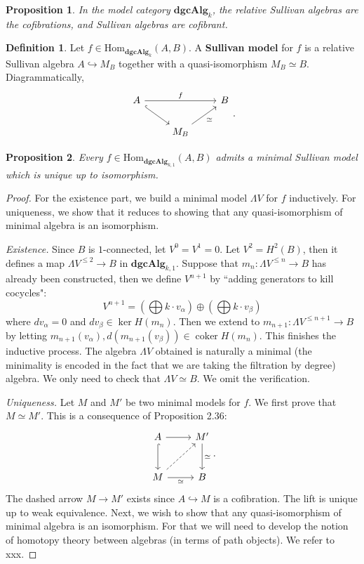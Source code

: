\documentclass[psamsfonts]{amsart}
\newtheorem{prop}{Proposition}[section]
\theoremstyle{definition}
\newtheorem{defn}{Definition}[section]
\newcommand{\dgcAlg}{\mathbf{dgcAlg}}
\newcommand{\Hom}{\mathrm{Hom}}
\DeclareMathOperator{\coker}{coker}
\numberwithin{equation}{section}
\begin{document}
\begin{prop}
In the model category $\dgcAlg_k$, the relative Sullivan algebras are the cofibrations, and Sullivan algebras are cofibrant.
\end{prop}

\begin{defn}
Let $f\in\Hom_{\dgcAlg_k}(A,B)$. A \textbf{Sullivan model} for $f$ is a relative Sullivan algebra $A\hookrightarrow M_B$ together with a quasi-isomorphism $M_B\simeq B$. Diagrammatically,
\[\begin{tikzcd}
A\arrow[dr,hookrightarrow]\arrow[rr,"f"]&&B\\
&M_B\arrow[ur,"\simeq"']
\end{tikzcd}.\]
\end{defn}

\begin{prop}
Every $f\in\Hom_{\dgcAlg_{k,1}}(A,B)$ admits a minimal Sullivan model which is unique up to isomorphism.
\end{prop}
\begin{proof}
For the existence part, we build a minimal model $\Lambda V$ for $f$ inductively. For uniqueness, we show that it reduces to showing that any quasi-isomorphism of minimal algebra is an isomorphism.\medbreak

\textit{Existence.} Since $B$ is $1$-connected, let $V^0=V^1=0$. Let $V^2=H^2(B)$, then it defines a map $\Lambda V^{\leq2}\to B$ in $\dgcAlg_{k,1}$. Suppose that $m_n:\Lambda V^{\leq n}\to B$ has already been constructed, then we define $V^{n+1}$ by ``adding generators to kill cocycles":
\[V^{n+1}=\left(\bigoplus k\cdot v_\alpha\right)\oplus\left(\bigoplus k\cdot v_\beta\right)\]
where $dv_\alpha=0$ and $dv_\beta\in\ker H(m_n)$. Then we extend to $m_{n+1}:\Lambda V^{\leq n+1}\to B$ by letting $m_{n+1}(v_\alpha),d(m_{n+1}(v_\beta))\in\coker H(m_n)$. This finishes the inductive process. The algebra $\Lambda V$ obtained is naturally a minimal (the minimality is encoded in the fact that we are taking the filtration by degree) algebra. We only need to check that $\Lambda V\simeq B$. We omit the verification.\medbreak

\textit{Uniqueness.} Let $M$ and $M'$ be two minimal models for $f$. We first prove that $M\simeq M'$. This is a consequence of Proposition 2.36:
\[\begin{tikzcd}[row sep=large]
A\arrow[d,hookrightarrow]\arrow[r]&M'\arrow[d,"\simeq"]\\
M\arrow[ur,dashed]\arrow[r,"\simeq"']&B
\end{tikzcd}.\]
The dashed arrow $M\to M'$ exists since $A\hookrightarrow M$ is a  cofibration. The lift is unique up to weak equivalence. Next, we wish to show that any quasi-isomorphism of minimal algebra is an isomorphism. For that we will need to develop the notion of homotopy theory between algebras (in terms of path objects). We refer to xxx.
\end{proof}
\end{document}
